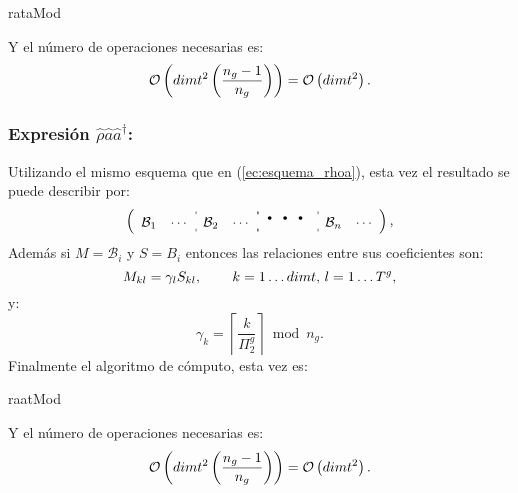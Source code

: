 \begin{algorithm}[H]
\caption{rataMod}\label{algo:rataMod}
\LinesNumbered
{}
\end{algorithm}
Y el n\'umero de operaciones necesarias es: $$\mathcal{O}\left(dimt^2\left(\frac{n_g-1}{n_g}\right)\right)=\mathcal{O}\left(dimt^2\right).$$
\subsubsection*{Expresi\'on $\hat{\rho}\hat{a}\hat{a}^{\dag}$: } Utilizando el mismo esquema que en (\ref{ec:esquema_rhoa}), esta vez el resultado se puede describir por:\begin{equation}\left(
\begin{array}{cc:cc:cc:cc}
 \mathcal{B}_1 & \cdots & \mathcal{B}_2 & \cdots & \multicolumn{2}{:c:}{\mbox{\Huge$\cdots$}} &\mathcal{B}_n&\cdots
\end{array}\right),
\end{equation}
Adem\'as si $M=\mathcal{B}_{i}$ y $S=B_{i}$ entonces las relaciones entre sus coeficientes son:\begin{equation}
M_{kl}=\gamma_{l}S_{kl},\,\qquad k=1\ldots dimt,\,l=1\ldots T^g, \label{ec:subbloque_raatM}
\end{equation}
y:\begin{equation}
 \gamma_{k}=\left\lceil \frac{k}{\Pi_2^g} \right\rceil\bmod n_g.\label{ec:coef_gammas_raatMod}
\end{equation}
\quad Finalmente el algoritmo de c\'omputo, esta vez es:

\begin{algorithm}[H]
\caption{raatMod}\label{algo:raatMod}
\LinesNumbered
{}
\end{algorithm}
\quad Y el n\'umero de operaciones necesarias es: $$\mathcal{O}\left(dimt^2\left(\frac{n_g-1}{n_g}\right)\right)=\mathcal{O}\left(dimt^2\right).$$
